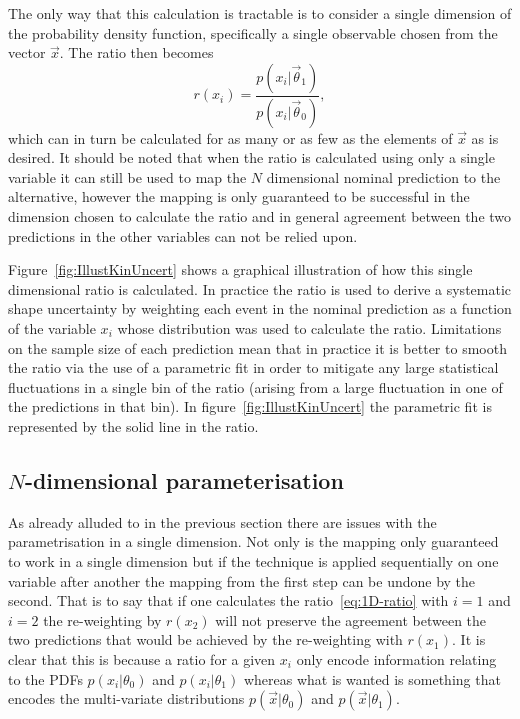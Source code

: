 The only way that this calculation is tractable is to consider a single
dimension of the probability density function, specifically a single observable
chosen from the vector $\vec{x}$. The ratio then becomes
\begin{equation}
  r(x_{i}) = \frac{p(x_{i}|\vec{\theta}_{1})}{p(x_{i}|\vec{\theta}_{0})},
  \label{eq:1D-ratio}
\end{equation}
which can in turn be calculated for as many or as few as the elements of
$\vec{x}$ as is desired. It should be noted that when the ratio is calculated
using only a single variable it can still be used to map the $N$ dimensional
nominal prediction to the alternative, however the mapping is only guaranteed to
be successful in the dimension chosen to calculate the ratio and in general
agreement between the two predictions in the other variables can not be relied
upon.

Figure~\ref{fig:IllustKinUncert} shows a graphical illustration of how this
single dimensional ratio is calculated. In practice the ratio is used to derive
a systematic shape uncertainty by weighting each event in the nominal
prediction as a function of the variable $x_{i}$ whose distribution was used to
calculate the ratio. Limitations on the sample size of each prediction mean that
in practice it is better to smooth the ratio via the use of a parametric fit in
order to mitigate any large statistical fluctuations in a single bin of the
ratio (arising from a large fluctuation in one of the predictions in that bin).
In figure~\ref{fig:IllustKinUncert} the parametric fit is represented by the
solid line in the ratio.


\subsection{$N$-dimensional parameterisation}
\label{sec:ND-reweight}

As already alluded to in the previous section there are issues with the
parametrisation in a single dimension. Not only is the mapping only guaranteed
to work in a single dimension but if the technique is applied sequentially on
one variable after another the mapping from the first step can be undone by the
second. That is to say that if one calculates the ratio~\ref{eq:1D-ratio} with
$i=1$ and $i=2$ the re-weighting by $r(x_2)$ will not preserve the agreement
between the two predictions that would be achieved by the re-weighting with
$r(x_1)$. It is clear that this is because a ratio for a given $x_i$ only encode
information relating to the PDFs $p(x_i|\theta_0)$ and $p(x_i|\theta_1)$ whereas
what is wanted is something that encodes the multi-variate distributions
$p(\vec{x}|\theta_0)$ and $p(\vec{x}|\theta_1)$.

